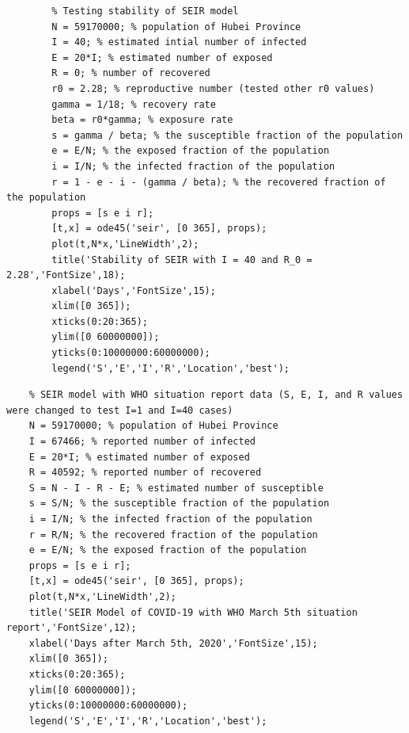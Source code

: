 \documentclass[12pt, a4paper]{article}
\begin{document}
    \begin{lstlisting}
        % Testing stability of SEIR model 
        N = 59170000; % population of Hubei Province
        I = 40; % estimated intial number of infected
        E = 20*I; % estimated number of exposed
        R = 0; % number of recovered
        r0 = 2.28; % reproductive number (tested other r0 values)
        gamma = 1/18; % recovery rate
        beta = r0*gamma; % exposure rate
        s = gamma / beta; % the susceptible fraction of the population
        e = E/N; % the exposed fraction of the population
        i = I/N; % the infected fraction of the population
        r = 1 - e - i - (gamma / beta); % the recovered fraction of the population
        props = [s e i r];
        [t,x] = ode45('seir', [0 365], props);
        plot(t,N*x,'LineWidth',2);
        title('Stability of SEIR with I = 40 and R_0 = 2.28','FontSize',18);
        xlabel('Days','FontSize',15); 
        xlim([0 365]);
        xticks(0:20:365);
        ylim([0 60000000]);
        yticks(0:10000000:60000000);
        legend('S','E','I','R','Location','best');
    \end{lstlisting}
    
    \newpage
    
    \begin{lstlisting}
    % SEIR model with WHO situation report data (S, E, I, and R values were changed to test I=1 and I=40 cases)
    N = 59170000; % population of Hubei Province
    I = 67466; % reported number of infected
    E = 20*I; % estimated number of exposed
    R = 40592; % reported number of recovered
    S = N - I - R - E; % estimated number of susceptible 
    s = S/N; % the susceptible fraction of the population
    i = I/N; % the infected fraction of the population
    r = R/N; % the recovered fraction of the population
    e = E/N; % the exposed fraction of the population
    props = [s e i r];
    [t,x] = ode45('seir', [0 365], props);
    plot(t,N*x,'LineWidth',2);
    title('SEIR Model of COVID-19 with WHO March 5th situation report','FontSize',12);
    xlabel('Days after March 5th, 2020','FontSize',15); 
    xlim([0 365]);
    xticks(0:20:365);
    ylim([0 60000000]);
    yticks(0:10000000:60000000);
    legend('S','E','I','R','Location','best');
    \end{lstlisting}

\newpage
\printbibliography[heading=bibintoc,
title={7 References}
]
\end{document}
